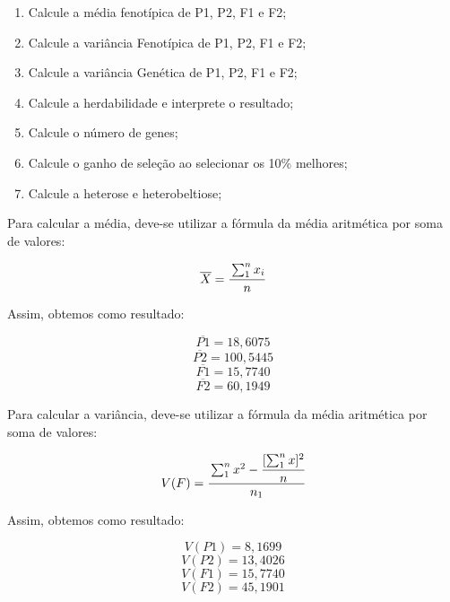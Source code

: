 \begin{enumerate}
\item Calcule a média fenotípica de P1, P2, F1 e F2;
\item Calcule a variância Fenotípica de P1, P2, F1 e F2;
\item Calcule a variância Genética de P1, P2, F1 e F2;
\item Calcule a herdabilidade e interprete o resultado;
\item Calcule o número de genes;
\item Calcule o ganho de seleção ao selecionar os 10\% melhores;
\item Calcule a heterose e heterobeltiose;
\end{enumerate}

\begin{solution} [Média de P1, P2, F1 e F2]

Para calcular a média, deve-se utilizar a fórmula da média aritmética por soma de valores:

\begin{equation}
\overline{X} =  \cfrac{\sum_{1}^{n} x_i}{n}
\end{equation}

Assim, obtemos como resultado:

\begin{equation}
\overline{P1} =  18,6075 
\end{equation}
\begin{equation}
\overline{P2} =  100,5445 
\end{equation}
\begin{equation}
\overline{F1} =  15,7740 
\end{equation}
\begin{equation}
\overline{F2} =  60,1949
\end{equation}

\end{solution}

\begin{solution} 



Para calcular a variância, deve-se utilizar a fórmula da média aritmética por soma de valores:

\begin{equation}
V(F) = \cfrac{\sum_{1}^{n} x^2 - \cfrac{[\sum_{1}^{n} x]^2}{n}}{n_1}
\end{equation}

Assim, obtemos como resultado:

\begin{equation}
V(P1) =  8,1699
\end{equation}
\begin{equation}
V(P2) =  13,4026
\end{equation}
\begin{equation}
V(F1) =  15,7740 
\end{equation}
\begin{equation}
V(F2) =  45,1901
\end{equation}

\end{solution}

